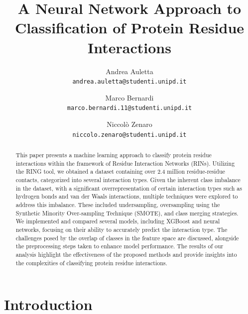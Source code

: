 \documentclass[10pt,twocolumn,letterpaper]{article}
\begin{document}
\title{A Neural Network Approach to Classification of Protein Residue Interactions}

\author{Andrea Auletta\\
{\tt\small andrea.auletta@studenti.unipd.it}
\and
Marco Bernardi\\
{\tt\small marco.bernardi.11@studenti.unipd.it}
\and
Niccolò Zenaro\\
{\tt\small niccolo.zenaro@studenti.unipd.it}
}

\maketitle

\begin{abstract}
    This paper presents a machine learning approach to classify protein residue interactions within the framework of Residue Interaction Networks (RINs). 
    Utilizing the RING tool, we obtained a dataset containing over 2.4 million residue-residue contacts, categorized into several interaction types. Given the inherent class imbalance in the dataset, with a significant overrepresentation of certain interaction types such as hydrogen bonds and van der Waals interactions, multiple techniques were explored to address this imbalance. 
    These included undersampling, oversampling using the Synthetic Minority Over-sampling Technique (SMOTE), and class merging strategies. We implemented and compared several models, including XGBoost and neural networks, focusing on their ability to accurately predict the interaction type. 
    The challenges posed by the overlap of classes in the feature space are discussed, alongside the preprocessing steps taken to enhance model performance. 
    The results of our analysis highlight the effectiveness of the proposed methods and provide insights into the complexities of classifying protein residue interactions.
\end{abstract}
    

\section{Introduction}
\end{document}
